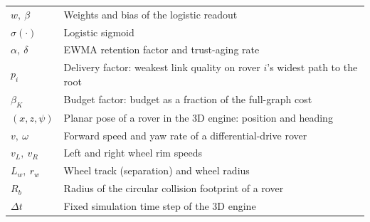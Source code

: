 \begin{singlespace}
\begin{longtable}{@{}p{3.8cm}p{10.4cm}@{}}
$w,\ \beta$ & Weights and bias of the logistic readout \\
$\sigma(\cdot)$ & Logistic sigmoid \\
$\alpha,\ \delta$ & EWMA retention factor and trust-aging rate \\
$p_i$ & Delivery factor: weakest link quality on rover $i$'s widest path to the root \\
$\beta_K$ & Budget factor: budget as a fraction of the full-graph cost \\
$(x,z,\psi)$ & Planar pose of a rover in the 3D engine: position and heading \\
$v,\ \omega$ & Forward speed and yaw rate of a differential-drive rover \\
$v_L,\ v_R$ & Left and right wheel rim speeds \\
$L_w,\ r_w$ & Wheel track (separation) and wheel radius \\
$R_b$ & Radius of the circular collision footprint of a rover \\
$\Delta t$ & Fixed simulation time step of the 3D engine \\
\end{longtable}
\end{singlespace}
\clearpage

